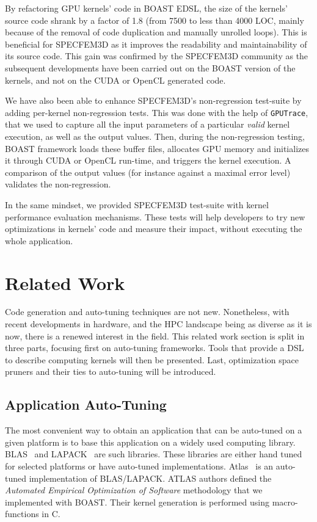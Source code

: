 \documentclass{IEEEtran}
\newcommand{\code}[1]{\texttt{#1}}
\begin{document}
By refactoring GPU kernels' code in BOAST EDSL, the size of the kernels' source code
shrank by a factor of 1.8 (from 7500 to less than 4000 LOC, mainly
because of the removal of code duplication and manually unrolled
loops). This is beneficial for SPECFEM3D as it improves the readability
and maintainability of its source code. This gain was confirmed by the
SPECFEM3D community as the subsequent developments have been carried out
on the BOAST version of the kernels, and not on the CUDA or OpenCL generated code.

We have also been able to enhance SPECFEM3D's non-regression test-suite
by adding per-kernel non-regression tests. This was done with the help
of \code{GPUTrace}, that we used to capture all the input parameters
of a particular \emph{valid} kernel execution, as well as the output
values. Then, during the non-regression testing, BOAST framework
loads these buffer files, allocates GPU memory and initializes it through
CUDA or OpenCL run-time, and triggers the kernel execution. A comparison
of the output values (for instance against a maximal error level)
validates the non-regression.

In the same mindset, we provided SPECFEM3D test-suite with kernel
performance evaluation mechanisms. These tests will help developers to
try new optimizations in kernels' code and measure their impact,
without executing the whole application.

\section{Related Work\label{sec:related}}

Code generation and auto-tuning techniques are not new. Nonetheless, with recent
developments in hardware, and the HPC landscape being as diverse as it is now,
there is a renewed interest in the field. This related work section is split in
three parts, focusing first on auto-tuning frameworks. Tools that provide a DSL
to describe computing kernels will then be presented. Last, optimization space
pruners and their ties to auto-tuning will be introduced.

\subsection{Application Auto-Tuning} 

The most convenient way to obtain an application that can be auto-tuned on a
given platform is to base this application on a widely used computing library.
BLAS~\cite{dongarra1990set} and LAPACK~\cite{laug} are such libraries. These
libraries are either hand tuned for selected platforms or have auto-tuned
implementations. Atlas~\cite{whaley04} is an auto-tuned implementation of
BLAS/LAPACK. ATLAS authors defined the \emph{Automated Empirical Optimization of
Software} methodology that we implemented with BOAST. Their kernel generation is
performed using macro-functions in C.
\end{document}
